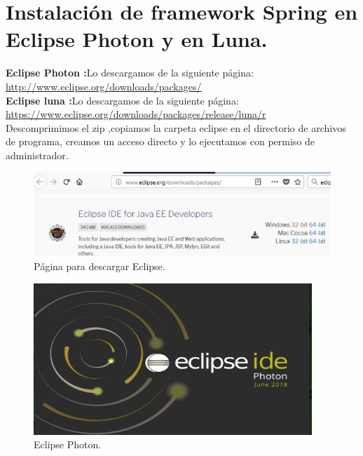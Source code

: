 \chapter{Instalaci\'on de framework Spring en Eclipse Photon y en Luna.}
\textbf{Eclipse Photon :}Lo descargamos de la siguiente p\'agina:\\
\url{http://www.eclipse.org/downloads/packages/}\\
\textbf{Eclipse luna :}Lo descargamos de la siguiente p\'agina:\\
\url{https://www.eclipse.org/downloads/packages/release/luna/r}\\
Descomprimimos el zip ,copiamos la carpeta eclipse en el directorio de archivos de programa, creamos un acceso directo y lo ejecutamos con permiso de administrador.
\begin{figure}[H] 
	\centering
	\includegraphics[scale=0.8]{images/c13_1.jpg}
	\caption{P\'agina para descargar Eclipse.}
\end{figure}
\begin{figure}[H] 
	\centering
	\includegraphics[scale=0.8]{images/c13_2.jpg}
	\caption{Eclipse Photon.}
\end{figure}
